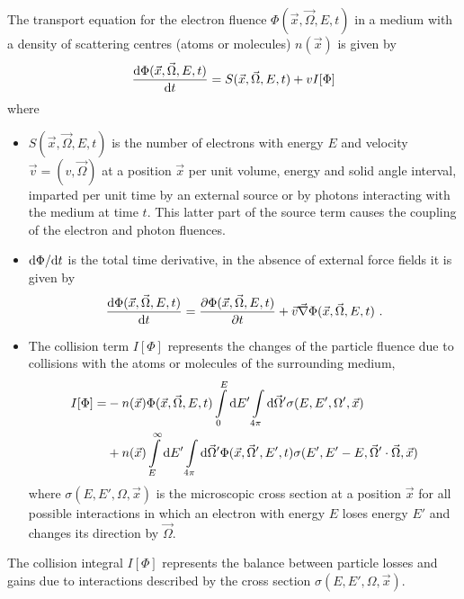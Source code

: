 The transport equation for the electron fluence 
$\Phi(\vec{x},\vec{\Omega},E,t)$ in a medium with a density of 
scattering centres (atoms or molecules) $n(\vec{x})$ is given by 
\begin{equation}
\label{transport1}
{{\rm d}\Phi(\vec{x},\vec{\Omega},E,t) \over {\rm d}t} = 
\index{electron transport!general discussion}
S(\vec{x},\vec{\Omega},E,t) + v I[\Phi] 
\end{equation}
where 
\begin{itemize}
\item
$S(\vec{x},\vec{\Omega},E,t)$ is the number of electrons with energy
$E$ and velocity $\vec{v} = (v,\vec{\Omega})$ at a position $\vec{x}$ per unit
volume, energy and solid angle interval, imparted per unit time 
by an external source or
by photons interacting with the medium at time $t$. This latter part of the
source term causes the coupling of the electron and photon fluences. 
\item
${\rm d}\Phi/{\rm d}t$ is the total time derivative, in the absence 
of external force fields it is given by 
\begin{equation}
{{\rm d}\Phi(\vec{x},\vec{\Omega},E,t) \over {\rm d}t}  = 
{\partial \Phi(\vec{x},\vec{\Omega},E,t) \over \partial t} + 
\vec{v} \vec{\nabla} \Phi(\vec{x},\vec{\Omega},E,t)~.
\end{equation}
\item
{}
The collision term $I[\Phi]$ represents the changes of the particle 
fluence due to collisions with the atoms or molecules of the 
surrounding medium,
\begin{equation}
\begin{split}
I[\Phi]  =  
 & - n(\vec{x}) \Phi(\vec{x},\vec{\Omega},E,t) 
\int\limits_0^E {\rm d} E' \int\limits_{4 \pi} {\rm d} \vec{\Omega}' 
\sigma(E,E',\Omega',\vec{x}) \\ 
& + 
n(\vec{x}) \int\limits_E^\infty {\rm d} E' \int\limits_{4 \pi}
{\rm d}\vec{\Omega}'
\Phi(\vec{x},\vec{\Omega}',E',t) 
\sigma(E',E'-E,\vec{\Omega}'\cdot \vec{\Omega},\vec{x})
\end{split}
\end{equation}
where
$\sigma(E,E',\Omega,\vec{x})$ is the microscopic cross section 
at a position $\vec{x}$ for all possible interactions in which 
an electron with energy $E$ loses energy $E'$ and changes its direction  
by $\vec{\Omega}$. 
\end{itemize}
The collision integral $I[\Phi]$ represents the balance between 
particle losses and gains due to interactions described by the 
cross section $\sigma(E,E',\Omega,\vec{x})$. 

